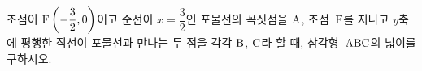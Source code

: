 초점이 $\mathrm{F}\left(-\dfrac{3}{2}{,}\mkern3mu\mathopen{}0\right)$이고 준선이 $x=\dfrac{3}{2}$인 포물선의 꼭짓점을 $\mathrm{A}$, 초점~$\mathrm{F}$를 지나고 $y$축에 평행한 직선이 포물선과 만나는 두 점을 각각 $\mathrm{B}$, $\mathrm{C}$라 할 때, 삼각형~$\mathrm{ABC}$의 넓이를 구하시오.
